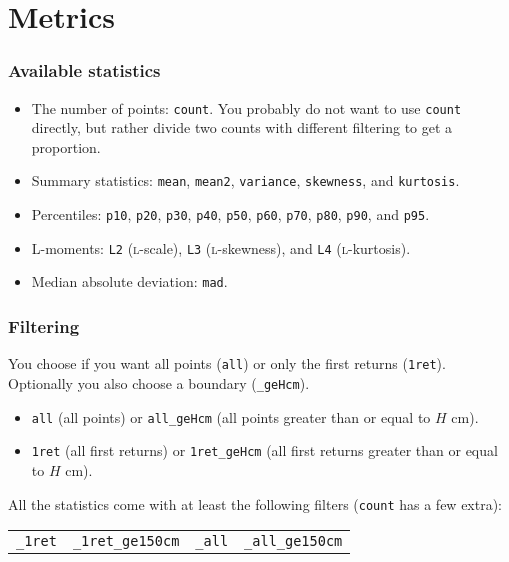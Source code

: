 \documentclass[10pt,english,a4paper
]{article}
\newcommand{\tabrow}[1]{\mname{#1\_1ret}	& \mname{#1\_1ret\_ge150cm}	& \mname{#1\_all}	& \mname{#1\_all\_ge150cm}	\\}
\newcommand{\mname}[1]{{\small\texttt{#1}}}
\begin{document}


\section{Metrics}\label{sec:metrics}

\subsubsection{Available statistics}\label{sec:statistics}
\begin{itemize}
	\item The number of points: \mname{count}. You probably do not want to use \mname{count} directly, but rather divide two counts with different filtering to get a proportion. 
	\item Summary statistics: \mname{mean}, \mname{mean2}, \mname{variance}, \mname{skewness}, and \mname{kurtosis}.
	\item Percentiles: \mname{p10}, \mname{p20}, \mname{p30}, \mname{p40}, \mname{p50}, \mname{p60}, \mname{p70}, 
								\mname{p80}, \mname{p90}, and \mname{p95}. 
	\item L-moments: \mname{L2} (\textsc{l}-scale), \mname{L3} (\textsc{l}-skewness), and \mname{L4} (\textsc{l}-kurtosis). 
	\item Median absolute deviation: \mname{mad}. 
\end{itemize}

\subsubsection{Filtering}\label{sec:filtering}
You choose if you want all points (\mname{all}) or only the first returns (\mname{1ret}). Optionally you also choose a boundary (\mname{\_geHcm}).
\begin{itemize}
	\item \mname{all} (all points) or \mname{all\_geHcm} (all points greater than or equal to $H$ cm). 
	\item \mname{1ret} (all first returns) or \mname{1ret\_geHcm} (all first returns greater than or equal to $H$ cm).
\end{itemize}
All the statistics come with at least the following filters (\mname{count} has a few extra):
\\{\small\begin{tabular}{@{}l@{, }l@{, }l@{, and }l@{.}}
	\tabrow{\mbox{}}
\end{tabular}}
\end{document}

